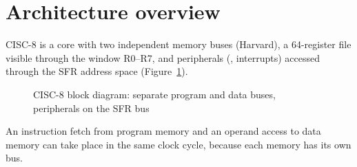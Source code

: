 \section{Architecture overview}
\label{sec:overview}

CISC-8 is a core with two independent memory buses (Harvard), a 64-register
file visible through the window R0--R7, and peripherals (\IIC, interrupts)
accessed through the SFR address space (Figure~\ref{fig:block}).

\begin{figure}[htbp]
  \centering
  
  \caption{CISC-8 block diagram: separate program and data buses, peripherals on the SFR bus}
  \label{fig:block}
\end{figure}

An instruction fetch from program memory and an operand access to data memory
can take place in the same clock cycle, because each memory has its own bus.
